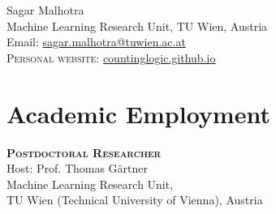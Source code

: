 \documentclass[10pt, a4paper]{article}
\newcommand{\years}[1]{\marginnote{\scriptsize #1}}
\begin{document}
{\LARGE Sagar Malhotra }\\[0.2cm]
Machine Learning Research Unit, TU Wien, Austria\\
 

Email: \href{mailto:sagar.malhotra@tuwien.ac.at}{sagar.malhotra@tuwien.ac.at}\\
\textsc{Personal website}: \href{https://countinglogic.github.io}{countinglogic.github.io}

\section*{Academic Employment}
\noindent
\years{2023-now}\textsc{\textbf{Postdoctoral Researcher}}\\
Host: Prof. Thomas G\"{a}rtner\\
Machine Learning Research Unit,\\
TU Wien (Technical University of Vienna), Austria
\end{document}
